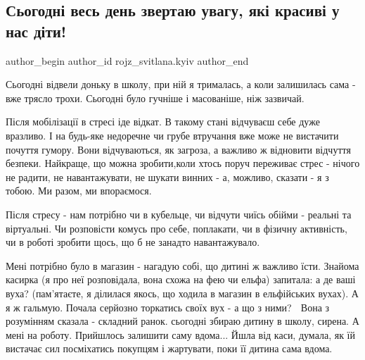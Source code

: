 
 
 
 
 
 
\subsection{Сьогодні весь день звертаю увагу, які красиві у нас діти!}
\label{sec:16_12_2022.fb.rojz_svitlana.kyiv.2.dity_krasyvi}
 
\ifcmt
 author_begin
   author_id rojz_svitlana.kyiv
 author_end
\fi

Сьогодні відвели доньку в школу, при ній я трималась, а коли залишилась сама -
вже трясло трохи. Сьогодні було гучніше і масованіше, ніж зазвичай. 

Після мобілізації в стресі іде відкат. В такому стані відчуваєш себе дуже
вразливо. І на будь-яке недоречне чи грубе втручання вже може не вистачити
почуття гумору. Вони відчуваються, як загроза, а важливо ж відновити відчуття
безпеки. Найкраще, що можна зробити,коли хтось поруч переживає стрес - нічого
не радити, не навантажувати, не шукати винних - а, можливо, сказати - я з
тобою. Ми разом, ми впораємося. 

Після стресу - нам потрібно чи в кубельце, чи відчути чиїсь обійми - реальні та
віртуальні. Чи розповісти комусь про себе, поплакати, чи в фізичну активність,
чи в роботі зробити щось, що б не занадто навантажувало. 

Мені потрібно було в магазин - нагадую собі, що дитині ж важливо їсти. Знайома
касирка (я про неї розповідала, вона схожа на фею чи ельфа) запитала: а де ваші
вуха? (пам'ятаєте, я ділилася якось, що ходила в магазин в ельфійських вухах).
А я ж гальмую. Почала серйозно торкатись своїх вух - а що з ними? 🙂 Вона з
розумінням  сказала - складний ранок. сьогодні збираю дитину в школу, сирена. А
мені на роботу. Прийшлось залишити саму вдома... Йшла від каси, думала, як їй
вистачає сил посміхатись покупцям і жартувати,  поки її дитина сама вдома. 

